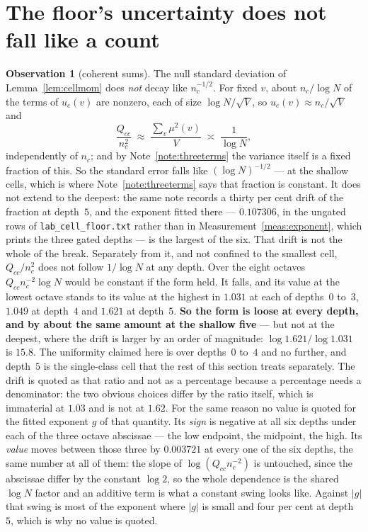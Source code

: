 \documentclass[11pt,a4paper]{article}
\theoremstyle{plain}
\theoremstyle{definition}
\newtheorem{observation}[theorem]{Observation}
\theoremstyle{remark}
\begin{document}
\section{The floor's uncertainty does not fall like a count}%
\label{sec:coh}

\begin{observation}[coherent sums]\label{obs:coh}
The null standard deviation of Lemma~\ref{lem:cellmom} does \emph{not} decay like
$n_c^{-1/2}$. For fixed $v$, about $n_c/\log N$ of the terms of
$u_c(v)$ are nonzero, each of size $\log N/\sqrt V$, so
$u_c(v)\approx n_c/\sqrt V$ and
\[
  \frac{Q_{cc}}{n_c^2}
  \;\approx\;\frac{\sum_v\mu^2(v)}{V}
  \;\asymp\;\frac{1}{\log N},
\]
independently of $n_c$; and by Note~\ref{note:threeterms} the variance
itself is a fixed fraction of this. So the standard error falls
like $(\log N)^{-1/2}$ --- at the shallow cells, which is where
Note~\ref{note:threeterms} says that fraction is constant. It
does not extend to the deepest: the same note records a thirty per
cent drift of the fraction at depth~$5$, and the exponent fitted there
--- $0.107306$, in the ungated rows of \texttt{lab\_cell\_floor.txt}
rather than in Measurement~\ref{meas:exponent}, which prints the three
gated depths --- is the largest of the six. That drift is not the
whole of the break. Separately from it, and not confined to the
smallest cell, $Q_{cc}/n_c^2$ does not follow $1\!/\!\log N$ at any
depth. Over the eight octaves
$Q_{cc}n_c^{-2}\log N$ would be constant if the form held. It falls,
and its value at the lowest octave stands to its value at the highest
in $1.031$ at each of depths~$0$ to~$3$, $1.049$ at depth~$4$ and
$1.621$ at depth~$5$. \textbf{So the form is loose at every depth, and
by about the same amount at the shallow five} --- but not at the
deepest, where the drift is larger by an order of magnitude:
$\log 1.621/\log 1.031$ is $15.8$. The uniformity claimed here is over
depths~$0$ to~$4$ and no further, and depth~$5$ is the single-class
cell that the rest of this section treats separately. The drift is quoted as that ratio and not as a
percentage because a percentage needs a denominator: the two obvious
choices differ by the ratio itself, which is immaterial at $1.03$ and
is not at $1.62$. For the same reason no value is quoted for the
fitted exponent $g$ of that quantity. Its
\emph{sign} is negative at all six depths under
each of the three octave abscissae --- the low endpoint, the midpoint,
the high. Its \emph{value} moves between those three by $0.003721$ at
every one of the six depths, the same number at all of them: the
slope of $\log(Q_{cc}n_c^{-2})$ is untouched, since the abscissae
differ by the constant $\log 2$, so the whole dependence is the shared
$\log N$ factor and an additive term is what a constant swing looks
like. Against $|g|$ that swing is most of the exponent where $|g|$ is
small and four per cent at depth~$5$, which is why no value is
quoted.


\end{observation}
\end{document}
